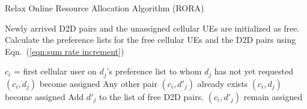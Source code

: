 \documentclass[times]{dacauth}
\begin{document}
\par
 \begin{algorithm}	
   \caption{Relax Online Resource Allocation Algorithm (RORA) }
   \label{algorthm2}
    \begin{algorithmic}[1]

       \State Newly arrived D2D pairs and the unassigned cellular UEs are initialized as free.  
        \State Calculate the preference lists for the free cellular UEs and the D2D pairs using Eqn.~(\ref{eqn:sum rate increment})
			
		
			\State $c_i$ = first cellular user on $d_j$'s preference list to whom $d_j$ has not yet requested
				\State $(c_i,d_j)$ become assigned
			\Else
				\State Any other pair $(c_i, d'_j)$ already exists
					\State $(c_i, d_j)$ become assigned
					\State Add $d'_j$ to the list of free D2D pairs.
				\Else
					\State $(c_i, d'_j)$ remain assigned
				\EndIf
			\EndIf
		\EndWhile      	
	\EndProcedure

\end{algorithmic}
\end{algorithm}
\end{document}
